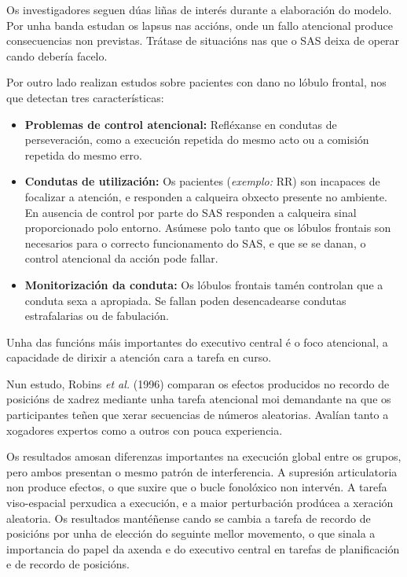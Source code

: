\documentclass[a4paper,11pt]{article}
\begin{document}
Os investigadores seguen dúas liñas de interés durante a elaboración do modelo. Por unha banda estudan os lapsus nas accións, onde un fallo atencional produce consecuencias non previstas. Trátase de situacións nas que o SAS deixa de operar cando debería facelo.

Por outro lado realizan estudos sobre pacientes con dano no lóbulo frontal, nos que detectan tres características:
\begin{itemize}
	\item \textbf{Problemas de control atencional:} Refléxanse en condutas de perseveración, como a
	execución repetida do mesmo acto ou a comisión repetida do mesmo erro.
	\item \textbf{Condutas de utilización:} Os pacientes (\textit{exemplo:} RR) son incapaces de
	focalizar a atención, e responden a calqueira obxecto presente no ambiente. En ausencia de
	control por parte do SAS responden a calqueira sinal proporcionado polo entorno. Asúmese polo
	tanto que os lóbulos frontais son necesarios para o correcto funcionamento do SAS, e que se se
	danan, o control atencional da acción pode fallar.
	\item \textbf{Monitorización da conduta:} Os lóbulos frontais tamén controlan que a conduta sexa
	a apropiada. Se fallan poden desencadearse condutas estrafalarias ou de fabulación.
\end{itemize}

Unha das funcións máis importantes do executivo central é o foco atencional, a capacidade de dirixir a atención cara a tarefa en curso. 

Nun estudo, Robins \textit{et al.} (1996) comparan os efectos producidos no recordo de posicións de xadrez mediante unha tarefa atencional moi demandante na que os participantes teñen que xerar secuencias de números aleatorias. Avalían tanto a xogadores expertos como a outros con pouca experiencia.

Os resultados amosan diferenzas importantes na execución global entre os grupos, pero ambos presentan o mesmo patrón de interferencia. A supresión articulatoria non produce efectos, o que suxire que o bucle fonolóxico non intervén. A tarefa viso-espacial perxudica a execución, e a maior perturbación prodúcea a xeración aleatoria. Os resultados mantéñense cando se cambia a tarefa de recordo de posicións por unha de elección do seguinte mellor movemento, o que sinala a importancia do papel da axenda e do executivo central en tarefas de planificación e de recordo de posicións.
\end{document}
